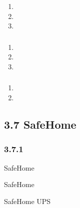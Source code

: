 \begin{enumerate}
\def\labelenumi{\arabic{enumi}.}
\tightlist
\item
\item
\item
\end{enumerate}

\hypertarget{section-53}{%
\subsubsection{}\label{section-53}}

\begin{enumerate}
\def\labelenumi{\arabic{enumi}.}
\tightlist
\item
\item
\item
\end{enumerate}

\hypertarget{section-54}{%
\subsubsection{}\label{section-54}}

\begin{enumerate}
\def\labelenumi{\arabic{enumi}.}
\tightlist
\item
\item
\end{enumerate}

\hypertarget{section-55}{%
\subsection{}\label{section-55}}

\hypertarget{safehome-2}{%
\subsection{3.7 SafeHome}\label{safehome-2}}

\hypertarget{section-56}{%
\subsubsection{3.7.1}\label{section-56}}

SafeHome



SafeHome


SafeHome UPS

